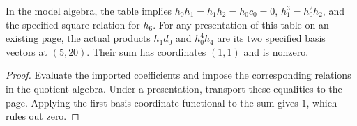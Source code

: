 \begin{lemma}
  \label{lem:lin-low-degree-table-relations}
  In the model algebra, the table implies
  $h_0h_1=h_1h_2=h_0c_0=0$, $h_1^3=h_0^2h_2$, and the specified
  square relation for $h_6$.
  For any presentation of this table on an existing page, the actual products
  $h_1d_0$ and $h_0^4h_4$ are its two specified basis vectors at $(5,20)$.
  Their sum has coordinates $(1,1)$ and is nonzero.
\end{lemma}
\begin{proof}
  Evaluate the imported coefficients and impose the corresponding relations
  in the quotient algebra.  Under a presentation, transport these equalities
  to the page.  Applying the first basis-coordinate functional to the sum
  gives $1$, which rules out zero.
\end{proof}

